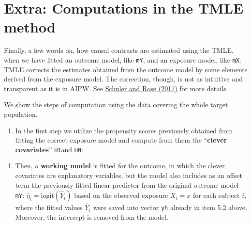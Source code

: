\documentclass[
]{book}
\newenvironment{Shaded}{\begin{snugshade}}{\end{snugshade}}
\newcommand{\DecValTok}[1]{\textcolor[rgb]{0.00,0.00,0.81}{#1}}
\newcommand{\NormalTok}[1]{#1}
\newcommand{\OtherTok}[1]{\textcolor[rgb]{0.56,0.35,0.01}{#1}}
\newcommand{\SpecialCharTok}[1]{\textcolor[rgb]{0.81,0.36,0.00}{\textbf{#1}}}
\providecommand{\tightlist}{%
  \setlength{\itemsep}{0pt}\setlength{\parskip}{0pt}}
\theoremstyle{definition}
\theoremstyle{definition}
\theoremstyle{definition}
\theoremstyle{definition}
\theoremstyle{remark}
\begin{document}
\section{Extra: Computations in the TMLE method}\label{extra-computations-in-the-tmle-method}

Finally, a few words on, how causal contrasts are estimated using the
TMLE, when we have fitted an outcome model, like \texttt{mY}, and an exposure
model, like \texttt{mX}. TMLE corrects the estimates obtained from the outcome
model by some elements derived from the exposure model. The correction,
though, is not as intuitive and transparent as it is in AIPW. See
\href{https://doi.org/10.1093/aje/kww165}{Schuler and Rose (2017)} for more
details.

We show the steps of computation using the data covering the whole
target population.

\begin{enumerate}
\def\labelenumi{\arabic{enumi}.}
\tightlist
\item
  In the first step we utilize the propensity scores previously
  obtained from fitting the correct exposure model and compute from
  them the ``\textbf{clever covariates}'' \texttt{H1}and \texttt{H0}:
\end{enumerate}

\begin{Shaded}
\end{Shaded}

\begin{enumerate}
\def\labelenumi{\arabic{enumi}.}
\setcounter{enumi}{1}
\tightlist
\item
  Then, a \textbf{working model} is fitted for the outcome, in which the
  clever covariates are explanatory variables, but the model also
  includes as an offset term the previously fitted linear predictor
  from the original outcome model \texttt{mY}:
  \(\widehat{\eta}_i = \text{logit}(\widehat Y_i)\) based on the
  observed exposure \(X_i=x\) for each subject \(i\), where the fitted
  values \(\widehat Y_i\) were saved into vector \texttt{yh} already in item
  5.2 above. Moreover, the intercept is removed from the model.
\end{enumerate}
\end{document}
